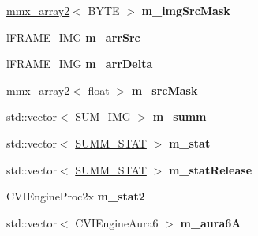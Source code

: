 \begin{DoxyCompactItemize}
\item 
\hypertarget{class_c_v_i_engine_base_a879bfc4065da678c4ca67ed828b05a05}{\hyperlink{classmmx__array2}{mmx\+\_\+array2}$<$ B\+Y\+T\+E $>$ {\bfseries m\+\_\+img\+Src\+Mask}}\label{class_c_v_i_engine_base_a879bfc4065da678c4ca67ed828b05a05}

\item 
\hypertarget{class_c_v_i_engine_base_a9b14da4c2f0ccba53a81ab89b89b2a03}{\hyperlink{classl_f_r_a_m_e___i_m_g}{l\+F\+R\+A\+M\+E\+\_\+\+I\+M\+G} {\bfseries m\+\_\+arr\+Src}}\label{class_c_v_i_engine_base_a9b14da4c2f0ccba53a81ab89b89b2a03}

\item 
\hypertarget{class_c_v_i_engine_base_abd1077e6704b0f6bbc788c4d3e7f150e}{\hyperlink{classl_f_r_a_m_e___i_m_g}{l\+F\+R\+A\+M\+E\+\_\+\+I\+M\+G} {\bfseries m\+\_\+arr\+Delta}}\label{class_c_v_i_engine_base_abd1077e6704b0f6bbc788c4d3e7f150e}

\item 
\hypertarget{class_c_v_i_engine_base_a0b3b91816e3f19ec5e531c5ad903be98}{\hyperlink{classmmx__array2}{mmx\+\_\+array2}$<$ float $>$ {\bfseries m\+\_\+src\+Mask}}\label{class_c_v_i_engine_base_a0b3b91816e3f19ec5e531c5ad903be98}

\item 
\hypertarget{class_c_v_i_engine_base_a29b792994f8c587ebdd4296031032f68}{std\+::vector$<$ \hyperlink{class_s_u_m___i_m_g}{S\+U\+M\+\_\+\+I\+M\+G} $>$ {\bfseries m\+\_\+summ}}\label{class_c_v_i_engine_base_a29b792994f8c587ebdd4296031032f68}

\item 
\hypertarget{class_c_v_i_engine_base_a73ff2aaa9eeb589ce6ea73ef5dd62fda}{std\+::vector$<$ \hyperlink{class_s_u_m_m___s_t_a_t}{S\+U\+M\+M\+\_\+\+S\+T\+A\+T} $>$ {\bfseries m\+\_\+stat}}\label{class_c_v_i_engine_base_a73ff2aaa9eeb589ce6ea73ef5dd62fda}

\item 
\hypertarget{class_c_v_i_engine_base_ab0a3c99fb49cddb42615132833b483d5}{std\+::vector$<$ \hyperlink{class_s_u_m_m___s_t_a_t}{S\+U\+M\+M\+\_\+\+S\+T\+A\+T} $>$ {\bfseries m\+\_\+stat\+Release}}\label{class_c_v_i_engine_base_ab0a3c99fb49cddb42615132833b483d5}

\item 
\hypertarget{class_c_v_i_engine_base_a91282745c78c776f8922e20c4f3198f5}{C\+V\+I\+Engine\+Proc2x {\bfseries m\+\_\+stat2}}\label{class_c_v_i_engine_base_a91282745c78c776f8922e20c4f3198f5}

\item 
\hypertarget{class_c_v_i_engine_base_aa4b9c935b9223f0efcc05282e871254d}{std\+::vector$<$ C\+V\+I\+Engine\+Aura6 $>$ {\bfseries m\+\_\+aura6\+A}}\label{class_c_v_i_engine_base_aa4b9c935b9223f0efcc05282e871254d}


\end{DoxyCompactItemize}
